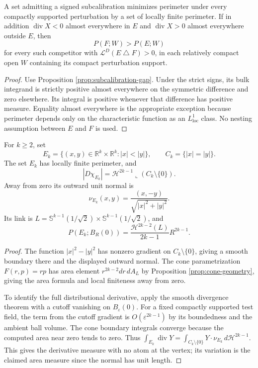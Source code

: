 \begin{corollary}\label{cor:subcalibration-minimizes}
A set admitting a signed subcalibration minimizes perimeter under every compactly supported perturbation by a set of locally finite perimeter. If in addition $\operatorname{div}X<0$ almost everywhere in $E$ and $\operatorname{div}X>0$ almost everywhere outside $E$, then
\[
 P(F;W)>P(E;W)
\]
for every such competitor with $\mathcal L^D(E\mathbin{\triangle}F)>0$, in each relatively compact open $W$ containing its compact perturbation support.
\end{corollary}
\begin{proof}
Use Proposition \ref{prop:subcalibration-gap}. Under the strict signs, its bulk integrand is strictly positive almost everywhere on the symmetric difference and zero elsewhere. Its integral is positive whenever that difference has positive measure. Equality almost everywhere is the appropriate exception because perimeter depends only on the characteristic function as an $L^1_{\mathrm{loc}}$ class. No nesting assumption between $E$ and $F$ is used.
\end{proof}

\begin{proposition}\label{prop:simons-cone-perimeter}
For $k\geq2$, set
\[
 E_k=\{(x,y)\in\mathbb R^k\times\mathbb R^k:|x|<|y|\},
 \qquad C_k=\{|x|=|y|\}.
\]
The set $E_k$ has locally finite perimeter, and
\[
 |D\chi_{E_k}|=\mathcal H^{2k-1}\llcorner(C_k\setminus\{0\}).
\]
Away from zero its outward unit normal is
\[
 \nu_{E_k}(x,y)=\frac{(x,-y)}{\sqrt{|x|^2+|y|^2}}.
\]
Its link is $L=\mathbb S^{k-1}(1/\sqrt2)\times\mathbb S^{k-1}(1/\sqrt2)$, and
\[
 P(E_k;B_R(0))=\frac{\mathcal H^{2k-2}(L)}{2k-1}R^{2k-1}.
\]
\end{proposition}
\begin{proof}
The function $|x|^2-|y|^2$ has nonzero gradient on $C_k\setminus\{0\}$, giving a smooth boundary there and the displayed outward normal. The cone parametrization $F(r,p)=rp$ has area element $r^{2k-2}dr\,dA_L$ by Proposition \ref{prop:cone-geometry}, giving the area formula and local finiteness away from zero.

To identify the full distributional derivative, apply the smooth divergence theorem with a cutoff vanishing on $B_\varepsilon(0)$. For a fixed compactly supported test field, the term from the cutoff gradient is $O(\varepsilon^{2k-1})$ by its boundedness and the ambient ball volume. The cone boundary integrals converge because the computed area near zero tends to zero. Thus $\int_{E_k}\operatorname{div}Y=\int_{C_k\setminus\{0\}}Y\cdot\nu_{E_k}\,d\mathcal H^{2k-1}$. This gives the derivative measure with no atom at the vertex; its variation is the claimed area measure since the normal has unit length.
\end{proof}

